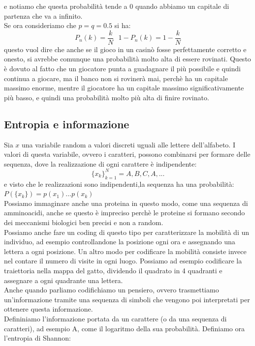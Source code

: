 \documentclass[12pt]{article}
\begin{document}
e notiamo che questa probabilità tende a 0 quando abbiamo un capitale di partenza che va a infinito. \\
Se ora consideriamo che $p=q=0.5$ si ha:
\begin{equation}
	P_n(k) = \frac{k}{N} \ \ \ 1-P_n(k) = 1 - \frac{k}{N}
\end{equation}
questo vuol dire che anche se il gioco in un casinò fosse perfettamente corretto e onesto, si avrebbe comunque una probabilità molto alta di essere rovinati. Questo è dovuto al fatto che un giocatore punta a guadagnare il più possibile e quindi continua a giocare, ma il banco non si rovinerà mai, perchè ha un capitale massimo enorme, mentre il giocatore ha un capitale massimo significativamente più basso, e quindi una probabilità molto più alta di finire rovinato.

\subsection{Entropia e informazione}
Sia $x$ una variabile random a valori discreti uguali alle lettere dell'alfabeto. I valori di questa variabile, ovvero i caratteri, possono combinarsi per formare delle sequenza, dove la realizzazione di ogni carattere è indipendente:
$$
	\{x_k\}_{k=1}^N = A, B, C, A, ...
$$
e visto che le realizzazioni sono indipendenti,la sequenza ha una probabilità: $P(\{x_k\})=p(x_1)...p(x_k)$ \\
Possiamo immaginare anche una proteina in questo modo, come una sequenza di amminoacidi, anche se questo è impreciso perchè le proteine si formano secondo dei meccanismi biologici ben precisi e non a random. \\
Possiamo anche fare un coding di questo tipo per caratterizzare la mobilità di un individuo, ad esempio controllandone la posizione ogni ora e assegnando una lettera a ogni posizione. Un altro modo per codificare la mobilità consiste invece nel contare il numero di visite in ogni luogo. Possiamo ad esempio codificare la traiettoria nella mappa del gatto, dividendo il quadrato in 4 quadranti e assegnare a ogni quadrante una lettera. \\
Anche quando parliamo codifichiamo un pensiero, ovvero trasmettiamo un'informazione tramite una sequenza di simboli che vengono poi interpretati per ottenere questa informazione. \\
Defininiamo l'informazione portata da un carattere (o da una sequenza di caratteri), ad esempio A, come il logaritmo della sua probabilità.
Definiamo ora l'entropia di Shannon:
\end{document}
